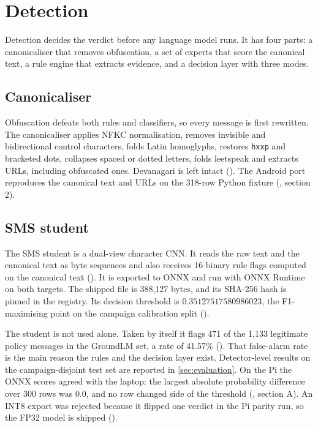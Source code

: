 \section{Detection}
\label{sec:detection}

Detection decides the verdict before any language model runs. It has four parts: a canonicaliser that removes obfuscation, a set of experts that score the canonical text, a rule engine that extracts evidence, and a decision layer with three modes.

\subsection{Canonicaliser}
\label{sec:canon}

Obfuscation defeats both rules and classifiers, so every message is first rewritten. The canonicaliser applies NFKC normalisation, removes invisible and bidirectional control characters, folds Latin homoglyphs, restores \texttt{hxxp} and bracketed dots, collapses spaced or dotted letters, folds leetspeak and extracts URLs, including obfuscated ones. Devanagari is left intact (). The Android port reproduces the canonical text and URLs on the 318-row Python fixture (, section 2).

\subsection{SMS student}
\label{sec:sms}

The SMS student is a dual-view character CNN. It reads the raw text and the canonical text as byte sequences and also receives 16 binary rule flags computed on the canonical text (). It is exported to ONNX and run with ONNX Runtime~\cite{onnxruntime} on both targets. The shipped file is 388,127 bytes, and its SHA-256 hash is pinned in the registry. Its decision threshold is $0.35127517580986023$, the F1-maximising point on the campaign calibration split ().

The student is not used alone. Taken by itself it flags 471 of the 1,133 legitimate policy messages in the GroundLM set, a rate of 41.57\% (). That false-alarm rate is the main reason the rules and the decision layer exist. Detector-level results on the campaign-disjoint test set are reported in \cref{sec:evaluation}. On the Pi the ONNX scores agreed with the laptop: the largest absolute probability difference over 300 rows was 0.0, and no row changed side of the threshold (, section A)\prose. An INT8 export was rejected because it flipped one verdict in the Pi parity run, so the FP32 model is shipped ()\prose.

